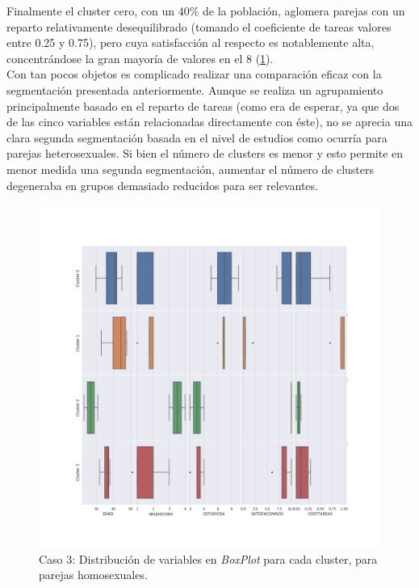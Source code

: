 \documentclass[11pt,a4paper]{article}
\begin{document}
	Finalmente el cluster cero, con un 40\% de la población, aglomera parejas con un reparto relativamente desequilibrado (tomando el coeficiente de tareas valores entre 0.25 y 0.75), pero cuya satisfacción al respecto es notablemente alta, concentrándose la gran mayoría de valores en el 8 (\ref{boxes3homo}). \\
	
	Con tan pocos objetos es complicado realizar una comparación eficaz con la segmentación presentada anteriormente. Aunque se realiza un agrupamiento principalmente basado en el reparto de tareas (como era de esperar, ya que dos de las cinco variables están relacionadas directamente con éste), no se aprecia una clara segunda segmentación basada en el nivel de estudios como ocurría para parejas heterosexuales. Si bien el número de clusters es menor y esto permite en menor medida una segunda segmentación, aumentar el número de clusters degeneraba en grupos demasiado reducidos para ser relevantes. \\
	
	\begin{figure}[] 
		\centering
		\includegraphics[scale=0.3]{../Caso3/homo/boxes}
		\caption{Caso 3: Distribución de variables en \emph{BoxPlot} para cada cluster, para parejas homosexuales.} 
		\label{boxes3homo}
	\end{figure}
\end{document}
